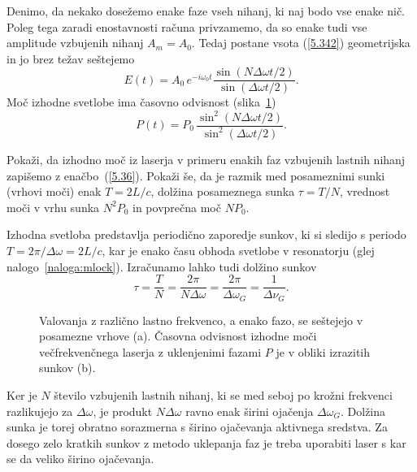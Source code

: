 Denimo, da nekako dosežemo enake faze vseh nihanj, ki naj bodo vse enake nič. 
Poleg tega zaradi enostavnosti
računa privzamemo, da so enake tudi vse amplitude vzbujenih nihanj $A_{m}= A_0$. Tedaj
postane vsota (\ref{5.342}) geometrijska in jo brez težav seštejemo 
\begin{equation}
E(t)=A_{0}\,e^{-i\omega _{0}t}\frac{\sin (N\Delta \omega t/2)}{\sin(\Delta
\omega t/2)}.
\label{5.352}
\end{equation}
Moč izhodne svetlobe ima časovno odvisnost (slika~\ref{s5.10})
\begin{equation}
P(t)=P_{0}\,\frac{\sin ^{2}(N\Delta \omega t/2)}{\sin ^{2}(\Delta \omega t/2)}.
\label{5.36}
\end{equation}

\begin{naloga}
\label{naloga:mlock}
Pokaži, da izhodno moč iz laserja v primeru enakih faz vzbujenih lastnih nihanj
zapišemo z enačbo~(\ref{5.36}). Pokaži še, da je razmik med posameznimi sunki (vrhovi
moči) enak $T=2L/c$, dolžina posameznega sunka $\tau = T/N$, vrednost moči v vrhu 
sunka $N^{2}P_{0}$ in povprečna moč $NP_{0}$.
\end{naloga}

Izhodna svetloba predstavlja periodično zaporedje sunkov, 
ki si sledijo s periodo $T=2\pi /\Delta \omega =2L/c$, kar je enako času obhoda
svetlobe v resonatorju (glej nalogo~\ref{naloga:mlock}).  Izračunamo lahko tudi 
dolžino sunkov
\begin{equation}
\tau=\frac{T}{N}=\frac{2\pi }{N\Delta \omega }=\frac{2\pi }{\Delta\omega_{G}} = 
\frac{1}{\Delta\nu_{G}}.
\label{5.37}
\end{equation}
\begin{figure}[h]
\centering
\def\svgwidth{130truemm} 

\caption{Valovanja z različno lastno frekvenco, a enako fazo, se seštejejo v 
posamezne vrhove (a). 
Časovna odvisnost izhodne moči večfrekvenčnega laserja z uklenjenimi fazami $P$ je 
v obliki izrazitih sunkov (b).}
\label{s5.10}
\end{figure}

Ker je $N$ število vzbujenih lastnih nihanj, ki se med seboj po krožni 
frekvenci razlikujejo za $\Delta \omega$, je produkt $N\Delta \omega$ ravno enak
širini ojačenja $\Delta \omega_{G}$. Dolžina sunka je torej obratno sorazmerna s širino
ojačevanja aktivnega sredstva. Za dosego zelo kratkih sunkov z metodo uklepanja
faz je treba uporabiti laser s kar se da veliko širino ojačevanja. 

